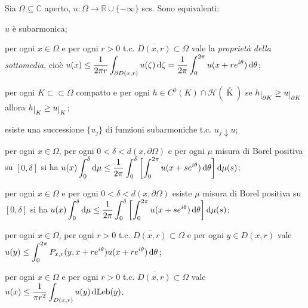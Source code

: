 \begin{thm} \label{car_subarmo}
  Sia $\Omega \subseteq \mathbb{C}$ aperto, $u:\Omega \longrightarrow \mathbb{R}\cup\{-\infty\}$ scs. Sono equivalenti:
  \begin{nlist}
    \item $u$ è subarmonica;
    \item per ogni $x \in \Omega$ e per ogni $r>0$ t.c. $\overline{D(x,r)} \subset \Omega$ vale la \textit{proprietà della sottomedia}, cioè $\displaystyle u(x) \le \frac{1}{2\pi r} \int_{\partial D(x,r)} u(\zeta)\mathop{}\!\mathrm{d}\zeta=\frac{1}{2\pi}\int_0^{2\pi} u(x+re^{i\theta})\mathop{}\!\mathrm{d}\theta$;
    \item per ogni $K \subset\subset \Omega$ compatto e per ogni $h \in C^0(K) \cap \mathcal{H}\left(\mathop {K}\limits^ \circ\right)$ se $h\restrict{\partial K}\ge u \restrict{\partial K}$ allora $h\restrict{K} \ge u \restrict{K}$;
    \item esiste una successione $\{u_j\}$ di funzioni subarmoniche t.c. $u_j \downarrow u$;
    \item per ogni $x \in \Omega$, per ogni $0<\delta<d(x, \partial \Omega)$ e per ogni $\mu$ misura di Borel positiva su $[0,\delta]$ si ha $\displaystyle u(x)\int_0^{\delta} \mathop{}\!\mathrm{d}\mu \le \frac{1}{2\pi}\int_0^{\delta}\left[\int_0^{2\pi} u(x+se^{i\theta})\mathop{}\!\mathrm{d}\theta\right]\mathop{}\!\mathrm{d}\mu(s)$;
    \item per ogni $x \in \Omega$ e per ogni $0<\delta<d(x, \partial \Omega)$ esiste $\mu$ misura di Borel positiva su $[0,\delta]$ si ha $\displaystyle u(x)\int_0^{\delta} \mathop{}\!\mathrm{d}\mu \le \frac{1}{2\pi}\int_0^{\delta}\left[\int_0^{2\pi} u(x+se^{i\theta})\mathop{}\!\mathrm{d}\theta\right]\mathop{}\!\mathrm{d}\mu(s)$;
    \item per ogni $x \in \Omega$, per ogni $r>0$ t.c. $\overline{D(x,r)}\subset \Omega$ e per ogni $y \in D(x,r)$ vale $\displaystyle u(y) \le \int_0^{2\pi} P_{x,r}(y,x+re^{i\theta})u(x+re^{i\theta})\mathop{}\!\mathrm{d}\theta$;
    \item per ogni $x \in \Omega$ e per ogni $r>0$ t.c. $\overline{D(x,r)}\subset \Omega$ vale $\displaystyle u(x) \le \frac{1}{\pi r^2} \int_{D(x,r)} u(y)\mathop{}\!\mathrm{d}\text{Leb}(y)$.
  \end{nlist}
\end{thm}

